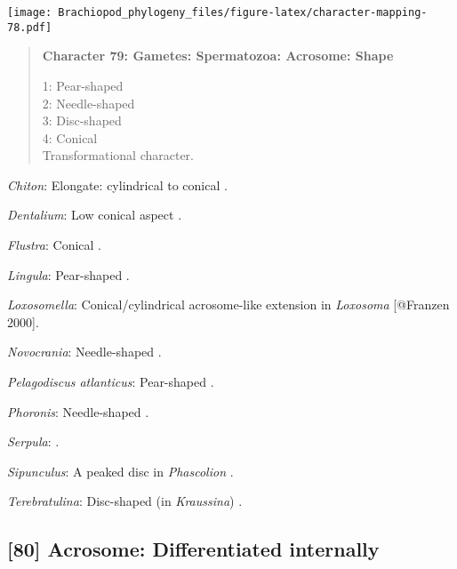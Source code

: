 \documentclass[openany]{book}
\theoremstyle{definition}
\theoremstyle{definition}
\theoremstyle{definition}
\theoremstyle{remark}
\begin{document}
\texttt{[image: Brachiopod\_phylogeny\_files/figure-latex/character-mapping-78.pdf]}

\begin{quote}
\textbf{Character 79: Gametes: Spermatozoa: Acrosome: Shape}

1: Pear-shaped\\
2: Needle-shaped\\
3: Disc-shaped\\
4: Conical\\
Transformational character.
\end{quote}

\hypertarget{Chiton-coding-79}{}
\emph{Chiton}: Elongate: cylindrical to conical
\citep{BucklandNicks1988}.

\hypertarget{Dentalium-coding-79}{}
\emph{Dentalium}: Low conical aspect \citep{DufresneDube1983}.

\hypertarget{Flustra-coding-79}{}
\emph{Flustra}: Conical \citep[in \emph{Tubulipora};][]{Franzen1984}.

\hypertarget{Lingula-coding-79}{}
\emph{Lingula}: Pear-shaped \citep{Fukumoto2003Theacrosome}.

\hypertarget{Loxosomella-coding-79}{}
\emph{Loxosomella}: Conical/cylindrical acrosome-like extension in
\emph{Loxosoma} {[}@Franzen 2000{]}.

\hypertarget{Novocrania-coding-79}{}
\emph{Novocrania}: Needle-shaped \citep{Afzelius1978Finestructure}.

\hypertarget{Pelagodiscus_atlanticus-coding-79}{}
\emph{Pelagodiscus atlanticus}: Pear-shaped
\citep{Hodgson1994Ultrastructureof}.

\hypertarget{Phoronis-coding-79}{}
\emph{Phoronis}: Needle-shaped \citep{Reunov2004Ultrastructuralstudy}.

\hypertarget{Serpula-coding-79}{}
\emph{Serpula}: \citet{Gherardi2011}.

\hypertarget{Sipunculus-coding-79}{}
\emph{Sipunculus}: A peaked disc in \emph{Phascolion} \citep{Rice1993}.

\hypertarget{Terebratulina-coding-79}{}
\emph{Terebratulina}: Disc-shaped (in \emph{Kraussina})
\citep{Hodgson1994Ultrastructureof}.

\subsection*{{[}80{]} Acrosome: Differentiated
internally}\label{acrosome-differentiated-internally}
\end{document}
